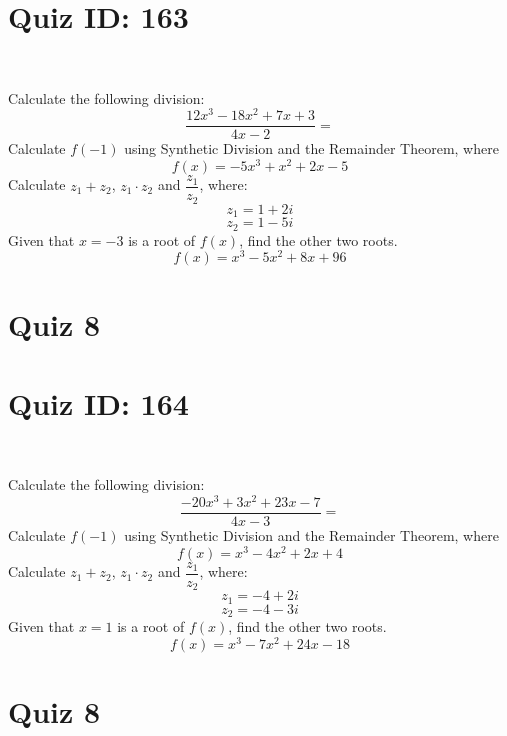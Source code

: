 \documentclass{exam}
\begin{document}
\section*{Quiz ID: 163}
\vspace{0.5cm}\
\vspace{1cm}\
\begin{questions}
\question Calculate the following division:\[\dfrac{
12x^3 - 18x^2 + 7x + 3}{
4x - 2}=\] \makeemptybox{\stretch{2}}
\question Calculate $f(-1)$ using Synthetic Division and the Remainder Theorem, where\[f(x) = 
-5x^3 + x^2 + 2x - 5\]
\newpage\question Calculate $z_1+z_2$, $z_1\cdot z_2$ and $\dfrac{z_1}{z_2}$, where:\[z_1=1+2\mathit{i}\]\[z_2=1-5\mathit{i}\]
\question Given that $x=-3$ is a root of $f(x)$, find the other two roots.\[f(x)=
x^3 - 5x^2 + 8x + 96\]\makeemptybox{\stretch{1}}
\end{questions}\newpage
\newpage
\section*{Quiz 8}
\section*{Quiz ID: 164}
\vspace{0.5cm}\
\vspace{1cm}\
\begin{questions}
\question Calculate the following division:\[\dfrac{
-20x^3 + 3x^2 + 23x - 7}{
4x - 3}=\] 
\question Calculate $f(-1)$ using Synthetic Division and the Remainder Theorem, where\[f(x) = 
x^3 - 4x^2 + 2x + 4\]
\newpage\question Calculate $z_1+z_2$, $z_1\cdot z_2$ and $\dfrac{z_1}{z_2}$, where:\[z_1=-4+2\mathit{i}\]\[z_2=-4-3\mathit{i}\]\makeemptybox{\stretch{1}}
\question Given that $x=1$ is a root of $f(x)$, find the other two roots.\[f(x)=
x^3 - 7x^2 + 24x - 18\]\makeemptybox{\stretch{1}}
\end{questions}\newpage
\newpage
\section*{Quiz 8}
\end{document}

